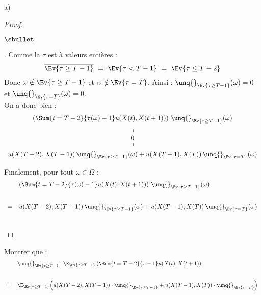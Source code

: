 \documentclass[11pt]{article}%
\begin{document}
\begin{noliste}{a)}
\begin{proof}
\begin{noliste}{$\sbullet$}
        
        \item {}. Comme la \var $\tau$ est à valeurs entières :
	\[
	  \overline{\Ev{\tau \geq T-1}} \ = \ \Ev{\tau < T-1} \ = \
	  \Ev{\tau \leq T-2}
	\]
	Donc $\omega \notin \Ev{\tau \geq T-1}$ et $\omega \notin 
	\Ev{\tau =T}$.
	Ainsi : $\unq{}_{\Ev{\tau \geq T-1}}(\omega)=0$ et 
	$\unq{}_{\Ev{\tau=T}}(\omega)=0$.\\
	On a donc bien :
	\[
	  \begin{array}{c}
	    \left( \Sum{t=T-2}{\tau(\omega)-1} u(X(t),X(t+1))\right) 
	    \, \unq{}_{\Ev{\tau \geq T-1}}(\omega)
	    \\[.2cm]
	    \shortparallel
	    \\
	    0
	    \\[-.1cm]
	    \shortparallel
	    \\[.1cm]
	    u(X(T-2),X(T-1)) \, \unq{}_{\Ev{\tau \geq T-1}}(\omega)
	    + u(X(T-1),X(T)) \, \unq{}_{\Ev{\tau =T}}(\omega)
	  \end{array}
	\]
      \end{noliste}
      Finalement, pour tout $\omega \in \Omega$ :
      \[
        \begin{array}{cl}
          & \left( \Sum{t=T-2}{\tau(\omega)-1} u(X(t),X(t+1))\right) \,
          \unq{}_{\Ev{\tau \geq T-1}}(\omega)
          \\[.8cm]
          =& u(X(T-2),X(T-1)) \, \unq{}_{\Ev{\tau \geq T-1}}(\omega)
          + u(X(T-1),X(T)) \, \unq{}_{\Ev{\tau =T}}(\omega)
        \end{array}
      \]
      
      
        
        
        
        
        ~\\[-1.4cm]
    \end{proof}
    
    \item Montrer que :
    \[
     \begin{array}{cl}
      & \unq{}_{\Ev{\tau \geq T-1}} \ \E_{\Ev{\tau \geq T-1}} 
      \left( \Sum{t=T-2}{\tau -1} u(X(t),X(t+1)\right) 
      \\[.8cm]
      = &
      \E_{\Ev{\tau \geq T-1}} \Big( u(X(T-2),X(T-1)) \cdot
      \unq{}_{\Ev{\tau \geq T-1}} + u(X(T-1),X(T)) \cdot 
      \unq{}_{\Ev{\tau = T}}\Big)
     \end{array}
    \]
    

\end{noliste}
\end{document}
